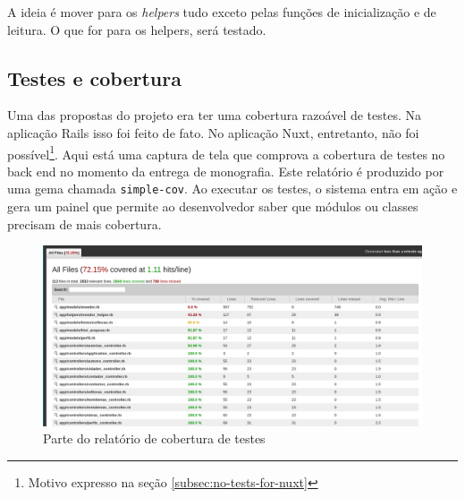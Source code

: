 A ideia é mover para os \emph{helpers} tudo exceto pelas funções de inicialização e de leitura.
O que for para os helpers, será testado.

\subsection{Testes e cobertura}
\label{subsec:testes-cobertura}

Uma das propostas do projeto era ter uma cobertura razoável de testes. Na aplicação Rails isso foi feito de fato. No
aplicação Nuxt, entretanto, não foi possível\footnote{Motivo expresso na seção \ref{subsec:no-tests-for-nuxt}}.
Aqui está uma captura de tela que comprova a cobertura de testes no back end no momento da entrega de monografia. Este
relatório é produzido por uma gema chamada \texttt{simple-cov}. Ao executar os testes, o sistema entra em ação e gera um
painel que permite ao desenvolvedor saber que módulos ou classes precisam de mais cobertura.

\begin{figure}[htb]
  \centering
  \includegraphics[width=.9\textwidth]{figuras/test_coverage.png}
  \caption{Parte do relatório de cobertura de testes}
  \label{fig:test-coverage}
\end{figure}
